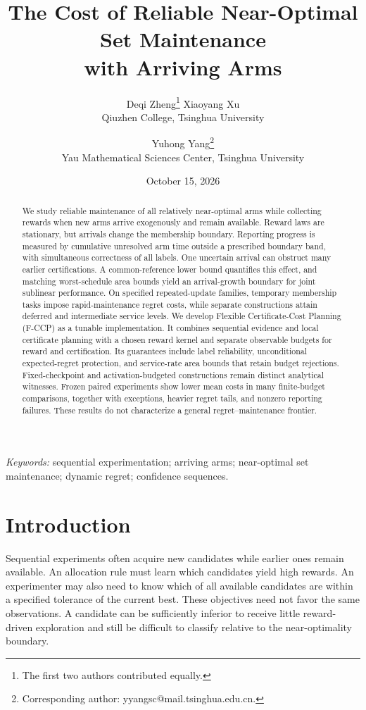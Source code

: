 \documentclass[11pt]{article}
\title{The Cost of Reliable Near-Optimal Set Maintenance\\with Arriving Arms}
\author{}
\author{Deqi Zheng\thanks{The first two authors contributed equally.} \quad
 Xiaoyang Xu\footnotemark[1] \\ Qiuzhen College, Tsinghua University
 \and Yuhong Yang\thanks{Corresponding author: yyangsc@mail.tsinghua.edu.cn.}\\
 Yau Mathematical Sciences Center, Tsinghua University}
\date{October 15, 2026}
\theoremstyle{remark}
\begin{document}
\maketitle

\begin{abstract}
We study reliable maintenance of all relatively near-optimal arms while
collecting rewards when new arms arrive exogenously and remain available.
Reward laws are stationary, but arrivals change the membership boundary.
Reporting progress is measured by cumulative unresolved arm time outside
a prescribed boundary band, with simultaneous correctness of all labels.
One uncertain arrival can obstruct many earlier certifications. A
common-reference lower bound quantifies this effect, and matching
worst-schedule area bounds yield an arrival-growth boundary for joint
sublinear performance. On specified repeated-update families, temporary
membership tasks impose rapid-maintenance regret costs, while separate
constructions attain deferred and intermediate service levels. We develop
Flexible Certificate-Cost Planning (F-CCP) as a tunable implementation. It
combines sequential evidence and local certificate planning with a chosen
reward kernel and separate observable budgets for reward and
certification. Its guarantees include label reliability, unconditional
expected-regret protection, and service-rate area bounds that retain
budget rejections. Fixed-checkpoint and activation-budgeted constructions
remain distinct analytical witnesses. Frozen paired experiments show
lower mean costs in many finite-budget comparisons, together with
exceptions, heavier regret tails, and nonzero reporting failures. These
results do not characterize a general regret--maintenance frontier.
\end{abstract}
\noindent\textit{Keywords:} sequential experimentation; arriving arms;
near-optimal set maintenance; dynamic regret; confidence sequences.

\section{Introduction}
\label{sec:introduction}

Sequential experiments often acquire new candidates while earlier ones remain
available. An allocation rule must learn which candidates yield high rewards.
An experimenter may also need to know which of all available candidates are
within a specified tolerance of the current best. These objectives need not
favor the same observations. A candidate can be sufficiently inferior to
receive little reward-driven exploration and still be difficult to classify
relative to the near-optimality boundary.
\end{document}
